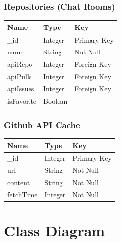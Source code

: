 \documentclass{report}
\begin{document}
\subsubsection{Repositories (Chat Rooms)}
\begin{tabular}{| l | l | l |}
    \hline
    \textbf{Name} & \textbf{Type} & \textbf{Key} \\
    \hline
    \hline
    \_id          & Integer       & Primary Key  \\
    \hline
    name          & String        & Not Null     \\
    \hline
    apiRepo       & Integer       & Foreign Key  \\
    \hline
    apiPulls      & Integer       & Foreign Key  \\
    \hline
    apiIssues     & Integer       & Foreign Key  \\
    \hline
    isFavorite    & Boolean       &              \\
    \hline
\end{tabular}

\subsubsection{Github API Cache}
\begin{tabular}{| l | l | l |}
    \hline
    \textbf{Name} & \textbf{Type} & \textbf{Key} \\
    \hline
    \hline
    \_id          & Integer       & Primary Key  \\
    \hline
    url           & String        & Not Null     \\
    \hline
    content       & String        & Not Null     \\
    \hline
    fetchTime     & Integer       & Not Null     \\
    \hline
\end{tabular}

\section{Class Diagram}
\end{document}
